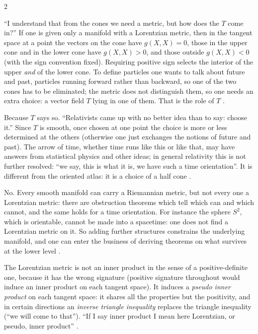 \begin{paracol}{2}
\begin{coursenote}
``I understand that from the cones we need a metric, but how does the $T$ come in?'' If one is given only a manifold with a Lorentzian metric, then in the tangent space at a point the vectors on the cone have $g(X,X)=0$, those in the upper cone and in the lower cone have $g(X,X)>0$, and those outside $g(X,X)<0$ (with the sign convention fixed). Requiring positive sign selects the interior of the upper \emph{and} of the lower cone. To define particles one wants to talk about future and past, particles running forward rather than backward, so one of the two cones has to be eliminated; the metric does not distinguish them, so one needs an extra choice: a vector field $T$ lying in one of them. That is the role of $T$ .
\end{coursenote}
\begin{coursenote}
Because $T$ says so. ``Relativists came up with no better idea than to say: choose it.'' Since $T$ is smooth, once chosen at one point the choice is more or less determined at the others (otherwise one just exchanges the notions of future and past). The arrow of time, whether time runs like this or like that, may have answers from statistical physics and other ideas; in general relativity this is not further resolved: ``we say, this is what it is, we have such a time orientation''. It is different from the oriented atlas: it is a choice of a half cone .
\end{coursenote}
\begin{coursenote}
No. Every smooth manifold can carry a Riemannian metric, but not every one a Lorentzian metric: there are obstruction theorems which tell which can and which cannot, and the same holds for a time orientation. For instance the sphere $S^2$, which is orientable, cannot be made into a spacetime: one does not find a Lorentzian metric on it. So adding further structures constrains the underlying manifold, and one can enter the business of deriving theorems on what survives at the lower level .
\end{coursenote}
\begin{coursenote}
The Lorentzian metric is not an inner product in the sense of a positive-definite one, because it has the wrong signature (positive signature throughout would induce an inner product on each tangent space). It induces a \emph{pseudo inner product} on each tangent space: it shares all the properties but the positivity, and in certain directions an \emph{inverse triangle inequality} replaces the triangle inequality (``we will come to that''). ``If I say inner product I mean here Lorentzian, or pseudo, inner product'' .
\end{coursenote}


\end{paracol}
